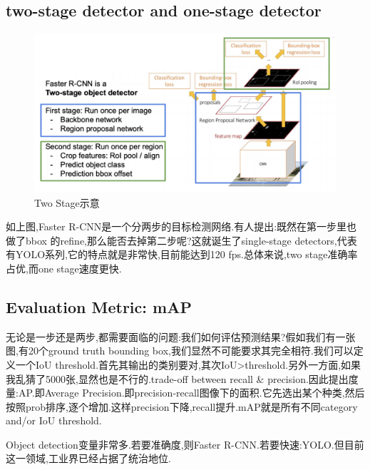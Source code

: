 \subsection{two-stage detector and one-stage detector}

\begin{figure}[htbp]
    \centering
    \includegraphics[scale=0.45]{figures/two_stage_detector.png}
    \caption{Two Stage示意}
    \label{}
\end{figure}

如上图,Faster R-CNN是一个分两步的目标检测网络.有人提出:既然在第一步里也做了bbox 的refine,那么能否去掉第二步呢?这就诞生了single-stage detectors,代表有YOLO系列,它的特点就是非常快,目前能达到120 fps.总体来说,two stage准确率占优,而one stage速度更快.

\subsection{Evaluation Metric: mAP}

无论是一步还是两步,都需要面临的问题:我们如何评估预测结果?假如我们有一张图,有20个ground truth bounding box,我们显然不可能要求其完全相符.我们可以定义一个IoU threshold.首先其输出的类别要对,其次IoU>threshold.另外一方面,如果我乱猜了5000张,显然也是不行的.trade-off between recall \& precision.因此提出度量:AP.即Average Precision.即precision-recall图像下的面积.它先选出某个种类,然后按照prob排序,逐个增加.这样precision下降,recall提升.mAP就是所有不同category and/or IoU threshold.

Object detection变量非常多.若要准确度,则Faster R-CNN.若要快速:YOLO.但目前这一领域,工业界已经占据了统治地位.
